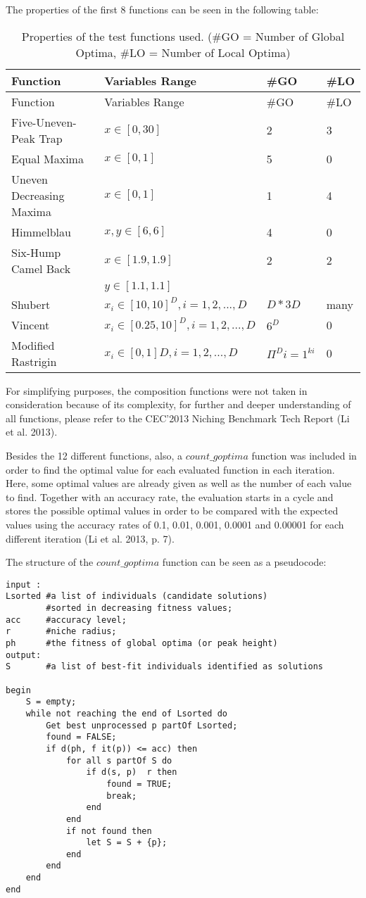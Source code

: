 \documentclass[12pt,a4paper]{article}
\begin{document}
The properties of the first 8 functions can be seen in the following
table:

\begin{longtable}[c]{@{}llll@{}}
\caption{Properties of the test functions used. (\#GO = Number of Global
Optima, \#LO = Number of Local Optima)}\tabularnewline
\toprule
Function & Variables Range & \#GO & \#LO\tabularnewline
\midrule
\endfirsthead
\toprule
Function & Variables Range & \#GO & \#LO\tabularnewline
\midrule
\endhead
Five-Uneven-Peak Trap & \(x \in [0, 30]\) & 2 & 3\tabularnewline
Equal Maxima & \(x \in [0, 1]\) & 5 & 0\tabularnewline
Uneven Decreasing Maxima & \(x \in [0, 1]\) & 1 & 4\tabularnewline
Himmelblau & \(x,y \in [6,6]\) & 4 & 0\tabularnewline
Six-Hump Camel Back & \(x \in [1.9, 1.9]\) & 2 & 2\tabularnewline
& \(y \in [1.1, 1.1]\) & &\tabularnewline
Shubert & \(x_i \in [10,10]^D,i=1,2,...,D\) & \(D * 3D\) &
many\tabularnewline
Vincent & \(x_i \in [0.25,10]^D, i = 1,2,...,D\) & \(6^D\) &
0\tabularnewline
Modified Rastrigin & \(x_i \in [0,1]D, i = 1,2,...,D\) &
\(\Pi^Di=1^{ki}\) & 0\tabularnewline
\bottomrule
\end{longtable}

For simplifying purposes, the composition functions were not taken in
consideration because of its complexity, for further and deeper
understanding of all functions, please refer to the CEC'2013 Niching
Benchmark Tech Report (Li et al. 2013).

Besides the 12 different functions, also, a \(count\_goptima\) function
was included in order to find the optimal value for each evaluated
function in each iteration. Here, some optimal values are already given
as well as the number of each value to find. Together with an accuracy
rate, the evaluation starts in a cycle and stores the possible optimal
values in order to be compared with the expected values using the
accuracy rates of 0.1, 0.01, 0.001, 0.0001 and 0.00001 for each
different iteration (Li et al. 2013, p. 7).

The structure of the \(count\_goptima\) function can be seen as a
pseudocode:

\begin{verbatim}
input :             
Lsorted #a list of individuals (candidate solutions) 
        #sorted in decreasing fitness values;       
acc     #accuracy level; 
r       #niche radius;          
ph      #the fitness of global optima (or peak height) 
output: 
S       #a list of best-fit individuals identified as solutions 

begin 
    S = empty;      
    while not reaching the end of Lsorted do 
        Get best unprocessed p partOf Lsorted;
        found = FALSE;          
        if d(ph, f it(p)) <= acc) then 
            for all s partOf S do                   
                if d(s, p)  r then 
                    found = TRUE; 
                    break; 
                end 
            end 
            if not found then 
                let S = S + {p}; 
            end 
        end 
    end 
end 
\end{verbatim}
\end{document}
